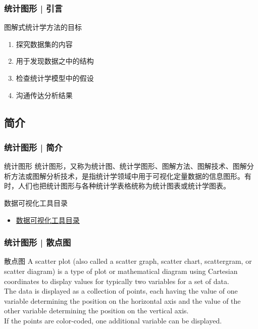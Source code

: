 \begin{frame}
  \frametitle{统计图形 | 引言}
  \begin{block}{\alert{图解式统计学方法的目标}}
    \begin{enumerate}
      \item 探究数据集的内容
      \item 用于发现数据之中的结构
      \item 检查统计学模型中的假设
      \item 沟通传达分析结果
    \end{enumerate}
  \end{block}
\end{frame}

\subsection{简介}
\begin{frame}
  \frametitle{统计图形 | 简介}
  \begin{block}{统计图形}
统计图形，又称为统计图、统计学图形、图解方法、图解技术、图解分析方法或图解分析技术，是指统计学领域中用于可视化定量数据的信息图形。有时，人们也把统计图形与各种统计学表格统称为统计图表或统计学图表。
  \end{block}
  \pause
  \begin{block}{数据可视化工具目录}
    \begin{itemize}
      \item \href{https://datavizcatalogue.com/ZH/}{数据可视化工具目录}
    \end{itemize}
  \end{block}
\end{frame}

\begin{frame}
  \frametitle{统计图形 | 散点图}
  \begin{block}{散点图}
    A scatter plot (also called a scatter graph, scatter chart, scattergram, or scatter diagram) is a type of plot or mathematical diagram using Cartesian coordinates to display values for typically two variables for a set of data.\\
    \vspace{0.5em}
    The data is displayed as a collection of points, each having the value of one variable determining the position on the horizontal axis and the value of the other variable determining the position on the vertical axis.\\
    \vspace{0.5em}
    If the points are color-coded, one additional variable can be displayed.
  \end{block}
\end{frame}

